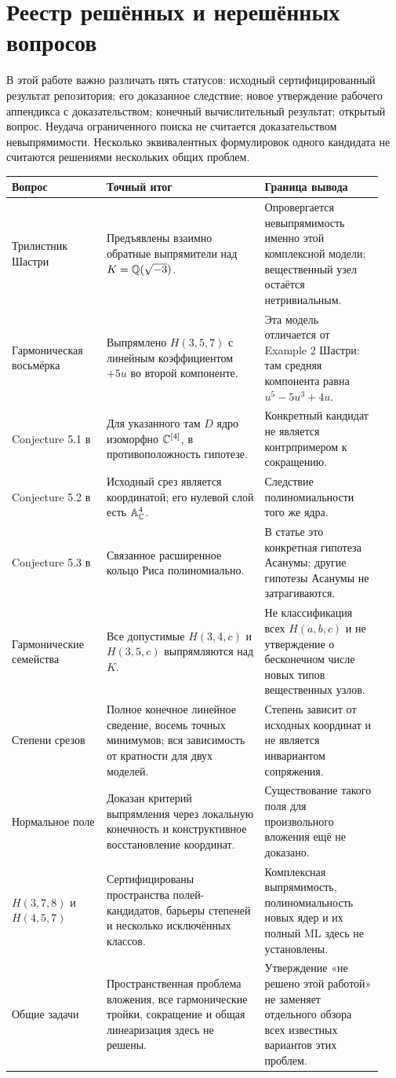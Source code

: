 \section{Реестр решённых и нерешённых вопросов}
В этой работе важно различать пять статусов: исходный сертифицированный
результат репозитория; его доказанное следствие; новое утверждение рабочего
аппендикса с доказательством; конечный вычислительный результат; открытый
вопрос. Неудача ограниченного поиска не считается доказательством
невыпрямимости. Несколько эквивалентных формулировок одного кандидата
не считаются решениями нескольких общих проблем.

\begin{longtable}{@{}L{0.24\linewidth}L{0.40\linewidth}L{0.30\linewidth}@{}}
\toprule Вопрос & Точный итог & Граница вывода\\\midrule\endhead
Трилистник Шастри & Предъявлены взаимно обратные выпрямители над
$K={\mathbb{Q}}(\sqrt{-3})$. & Опровергается невыпрямимость именно этой комплексной
модели; вещественный узел остаётся нетривиальным.\\[5pt]
Гармоническая восьмёрка & Выпрямлено $H(3,5,7)$ с линейным коэффициентом
$+5u$ во второй компоненте. & Эта модель отличается от Example 2
Шастри: там средняя компонента равна $u^5-5u^3+4u$.\\[5pt]
Conjecture 5.1 в \cite{vdER} & Для указанного там $D$ ядро изоморфно
${\mathbb{C}}^{[4]}$, в противоположность гипотезе. & Конкретный кандидат не является
контрпримером к сокращению.\\[5pt]
Conjecture 5.2 в \cite{vdER} & Исходный срез является координатой;
его нулевой слой есть ${\mathbb{A}}^4_{\mathbb{C}}$. & Следствие полиномиальности того же ядра.\\[5pt]
Conjecture 5.3 в \cite{vdER} & Связанное расширенное кольцо Риса
полиномиально. & В статье это конкретная гипотеза Асанумы;
другие гипотезы Асанумы не затрагиваются.\\[5pt]
Гармонические семейства & Все допустимые $H(3,4,c)$ и $H(3,5,c)$
выпрямляются над $K$. & Не классификация всех $H(a,b,c)$ и не утверждение
о бесконечном числе новых типов вещественных узлов.\\[5pt]
Степени срезов & Полное конечное линейное сведение, восемь точных минимумов;
вся зависимость от кратности для двух моделей. & Степень зависит от исходных
координат и не является инвариантом сопряжения.\\[5pt]
Нормальное поле & Доказан критерий выпрямления через локальную конечность
и конструктивное восстановление координат. & Существование такого поля
для произвольного вложения ещё не доказано.\\[5pt]
$H(3,7,8)$ и $H(4,5,7)$ & Сертифицированы пространства полей-кандидатов,
барьеры степеней и несколько исключённых классов. & Комплексная выпрямимость,
полиномиальность новых ядер и их полный ML здесь не установлены.\\[5pt]
Общие задачи & Пространственная проблема вложения, все гармонические
тройки, сокращение и общая линеаризация здесь не решены. & Утверждение
«не решено этой работой» не заменяет отдельного обзора всех известных
вариантов этих проблем.\\\bottomrule
\end{longtable}

